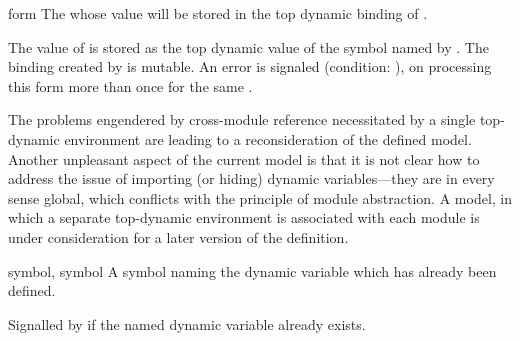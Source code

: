 \begin{optDefinition}
\begin{arguments}
    \item[form] The  whose value will be stored in the top dynamic
    binding of .
\end{arguments}
%
\remarks%
The value of  is stored as the top dynamic value of the symbol named
by  .  The binding created by
 is mutable.  An error is signaled (condition:
), on processing this form more than
once for the same .
%
\begin{note}
    The problems engendered by cross-module reference necessitated by a single
    top-dynamic environment are leading to a reconsideration of the defined
    model.  Another unpleasant aspect of the current model is that it is not
    clear how to address the issue of importing (or hiding) dynamic
    variables---they are in every sense global, which conflicts with the
    principle of module abstraction.  A model, in which a separate top-dynamic
    environment is associated with each module is under consideration for a
    later version of the definition.
\end{note}

%
\begin{initoptions}
    \item[symbol, symbol] A symbol naming the dynamic variable which has already
    been defined.
\end{initoptions}
%
\remarks%
Signalled by  if the named dynamic variable already
exists.
\end{optDefinition}

